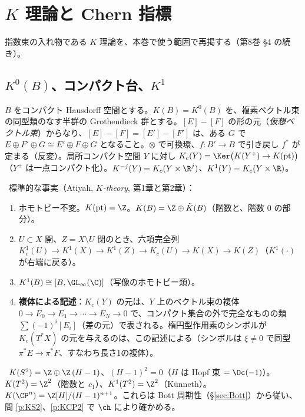 
\section{$K$ 理論と Chern 指標}\label{sec:K}
指数束の入れ物である $K$ 理論を、本巻で使う範囲で再掲する（第8巻 \S4 の続き）。

\subsection{$K^0(B)$、コンパクト台、$K^1$}
\begin{defn}\label{def:K}
$B$ をコンパクト Hausdorff 空間とする。$K(B)=K^0(B)$ を、複素ベクトル束の同型類のなす半群の Grothendieck 群とする。$[E]-[F]$ の形の元（\emph{仮想ベクトル束}）からなり、$[E]-[F]=[E']-[F']$ は、ある $G$ で $E\oplus F'\oplus G\cong E'\oplus F\oplus G$ となること。$\otimes$ で可換環、$f:B'\to B$ で引き戻し $f^*$ が定まる（反変）。局所コンパクト空間 $Y$ に対し $K_c(Y)=\Ker\bigl(K(Y^+)\to K(\mathrm{pt})\bigr)$（$Y^+$ は一点コンパクト化）。$K^{-j}(Y)=K_c(Y\times\R^j)$、$K^1(Y)=K_c(Y\times\R)$。
\end{defn}
\tC\ 標準的な事実（Atiyah, \emph{$K$-theory}, 第1章と第2章）：
\begin{enumerate}
\item ホモトピー不変。$K(\mathrm{pt})=\Z$。$K(B)=\Z\oplus\tilde K(B)$（階数と、階数 $0$ の部分）。
\item $U\subset X$ 開、$Z=X\setminus U$ 閉のとき、六項完全列 $K^1_c(U)\to K^1(X)\to K^1(Z)\to K_c(U)\to K(X)\to K(Z)$（$K^1(\cdot)$ が右端に戻る）。
\item $K^1(B)\cong[B,\GL_\infty(\C)]$（写像のホモトピー類）。
\item \textbf{複体による記述}：$K_c(Y)$ の元は、$Y$ 上のベクトル束の複体 $0\to E_0\to E_1\to\cdots\to E_N\to0$ で、コンパクト集合の外で完全なものの類 $\sum(-1)^i[E_i]$（差の元）で表される。楕円型作用素のシンボルが $K_c(T^*X)$ の元を与えるのは、この記述による（シンボルは $\xi\ne0$ で同型 $\pi^*E\to\pi^*F$、すなわち長さ1の複体）。
\end{enumerate}
\begin{ex}\label{ex:KS2}\tC\
$K(S^2)=\Z\oplus\Z\,(H-1)$、$(H-1)^2=0$（$H$ は Hopf 束 $=\Oc(-1)$）。$K(T^2)=\Z^2$（階数と $c_1$）、$K^1(T^2)=\Z^2$（Künneth）。$K(\CP^n)=\Z[H]/(H-1)^{n+1}$。これらは Bott 周期性（\S\ref{sec:Bott}）から従い、問 \ref{p:KS2}、\ref{p:KCP2} で $\ch$ により確かめる。
\end{ex}

